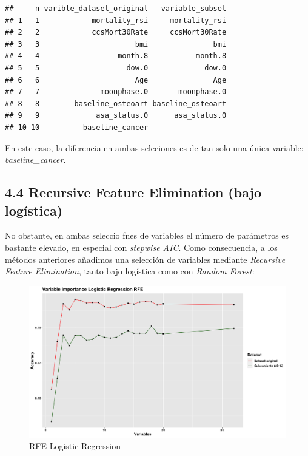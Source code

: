 \documentclass[
]{article}
\begin{document}
\begin{verbatim}
##     n varible_dataset_original   variable_subset
## 1   1            mortality_rsi     mortality_rsi
## 2   2            ccsMort30Rate     ccsMort30Rate
## 3   3                      bmi               bmi
## 4   4                  month.8           month.8
## 5   5                    dow.0             dow.0
## 6   6                      Age               Age
## 7   7              moonphase.0       moonphase.0
## 8   8        baseline_osteoart baseline_osteoart
## 9   9             asa_status.0      asa_status.0
## 10 10          baseline_cancer                 -
\end{verbatim}

En este caso, la diferencia en ambas seleciones es de tan solo una única
variable: \emph{baseline\_cancer}.

\hypertarget{recursive-feature-elimination-bajo-loguxedstica}{%
\subsection{4.4 Recursive Feature Elimination (bajo
logística)}\label{recursive-feature-elimination-bajo-loguxedstica}}

No obstante, en ambas seleccio fnes de variables el número de parámetros
es bastante elevado, en especial con \emph{stepwise AIC}. Como
consecuencia, a los métodos anteriores añadimos una selección de
variables mediante \emph{Recursive Feature Elimination}, tanto bajo
logística como con \emph{Random Forest}:

\begin{figure}[h!]

{\centering \includegraphics[width=0.99\linewidth,height=0.99\textheight,]{./charts/01_feature_selection_RFE_LR_whole_dataset} 

}

\caption{RFE Logistic Regression}\label{fig:unnamed-chunk-34}
\end{figure}
\end{document}
